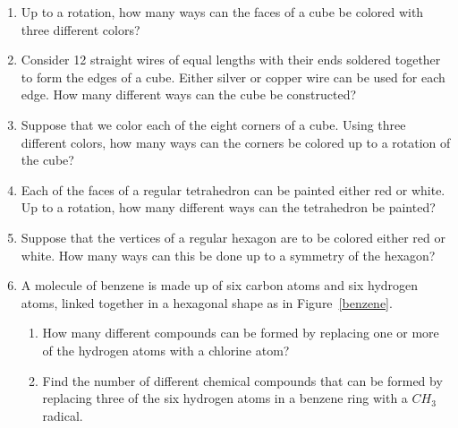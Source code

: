 {\begin{enumerate}
\item
Up to a rotation, how many ways can the faces of a cube be colored
with three different colors? 
 
 
 
\item
Consider 12 straight wires of equal lengths with their ends soldered
together to form the edges of a cube. Either silver or copper wire can be
used for each edge.  How many different ways can the cube be
constructed? 
 
 
 
\item
Suppose that we color each of the eight corners of a cube. Using three
different colors, how many ways can the corners be colored up to a
rotation of the cube? 
 
 
\item
Each of the faces of a regular tetrahedron can be painted either red
or white.  Up to a rotation, how many different ways can the
tetrahedron be painted? 
 
 
\item
Suppose that the vertices of a regular hexagon are to be colored either
red or white.  How many ways can this be done up to a symmetry  of the
hexagon? 
 
 
\item
A molecule of benzene is made up of six carbon atoms and six hydrogen
atoms, linked together in a hexagonal shape as in Figure~\ref{benzene}.
\begin{enumerate}
 
 \item
How many different compounds can be formed by replacing one or more of
the hydrogen atoms with a chlorine atom? 
 
 \item
Find the number of different chemical compounds that can be formed by
replacing three of the six hydrogen atoms in a benzene ring with a
$CH_3$ radical.
 
\end{enumerate}
 
 
\begin{figure}[ht]
\begin{center}
\end{center}
\end{figure}
\end{enumerate}}

